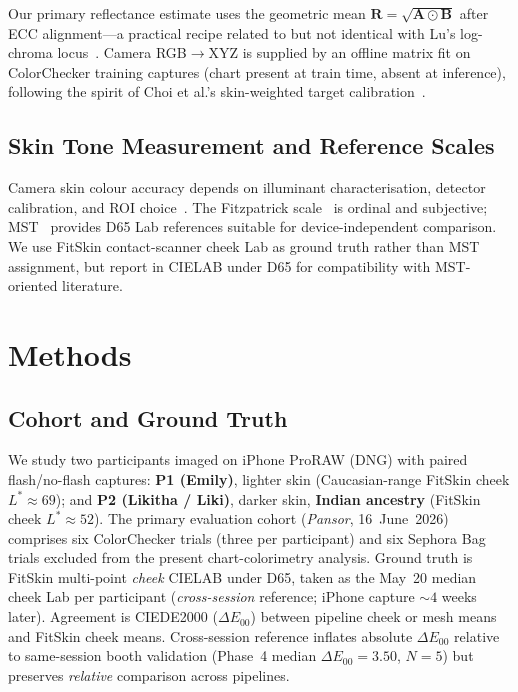 \documentclass[11pt]{article}
\newcommand{\deee}{\ensuremath{\Delta E_{00}}}
\newcommand{\Rvec}{\mathbf{R}}
\begin{document}
Our primary reflectance estimate uses the geometric mean $\Rvec=\sqrt{\mathbf{A}\odot\mathbf{B}}$ after ECC alignment---a practical recipe related to but not identical with Lu's log-chroma locus~\cite{lu2006practical,evangelidis2008parametric}.
Camera RGB$\rightarrow$XYZ is supplied by an offline matrix fit on ColorChecker training captures (chart present at train time, absent at inference), following the spirit of Choi et al.'s skin-weighted target calibration~\cite{choi2017performance}.

\subsection{Skin Tone Measurement and Reference Scales}

Camera skin colour accuracy depends on illuminant characterisation, detector calibration, and ROI choice~\cite{harville2005consistent,choi2017performance,cook2025colorimetric}.
The Fitzpatrick scale~\cite{fitzpatrick1988} is ordinal and subjective; MST~\cite{cheng2024monastic} provides D65 Lab references suitable for device-independent comparison.
We use FitSkin contact-scanner cheek Lab as ground truth rather than MST assignment, but report in CIELAB under D65 for compatibility with MST-oriented literature.

\section{Methods}\label{sec:methods}

\subsection{Cohort and Ground Truth}

We study two participants imaged on iPhone ProRAW (DNG) with paired flash/no-flash captures:
\textbf{P1 (Emily)}, lighter skin (Caucasian-range FitSkin cheek $L^*\approx 69$); and
\textbf{P2 (Likitha / Liki)}, darker skin, \textbf{Indian ancestry} (FitSkin cheek $L^*\approx 52$).
The primary evaluation cohort (\emph{Pansor}, 16~June~2026) comprises six ColorChecker trials (three per participant) and six Sephora Bag trials excluded from the present chart-colorimetry analysis.
Ground truth is FitSkin multi-point \emph{cheek} CIELAB under D65, taken as the May~20 median cheek Lab per participant (\emph{cross-session} reference; iPhone capture ${\sim}4$ weeks later).
Agreement is CIEDE2000 ($\deee$) between pipeline cheek or mesh means and FitSkin cheek means.
Cross-session reference inflates absolute $\deee$ relative to same-session booth validation (Phase~4 median $\deee=3.50$, $N=5$) but preserves \emph{relative} comparison across pipelines.
\end{document}
